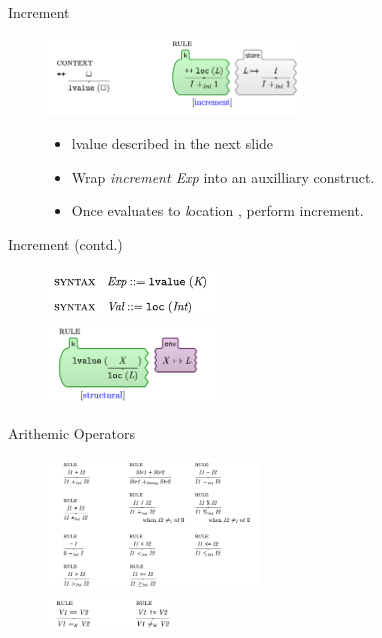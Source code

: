 \documentclass{beamer}
\begin{document}
\begin{frame}{Increment}
\begin{figure}[h]
    \includegraphics[width=0.6\textwidth]{increment}

    \begin{itemize}
        \item lvalue described in the next slide
        \pause
        \item Wrap \textit{increment Exp} into an auxilliary  construct.
        \item Once  evaluates to \textit location ,
              perform increment.
    \end{itemize}
\end{figure}

\end{frame}

\begin{frame}{Increment (contd.)}
    \begin{figure}
        \centering
    \includegraphics[width=0.4\textwidth]{lvalue-decl}
    \\
    \includegraphics[width=0.4\textwidth]{lvalue-rules}
    \end{figure}
\end{frame}

\begin{frame}{Arithemic Operators}
    \begin{figure}
        \centering
    \includegraphics[width=0.5\textwidth]{arith-1}
    \\
    \includegraphics[width=0.3\textwidth]{arith-2}
    \end{figure}
\end{frame}
\end{document}
